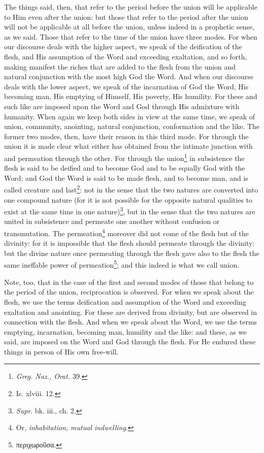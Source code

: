 The things said, then, that refer to the period before the union will be applicable to Him even after the union: but those that refer to the period after the union will not be applicable at all before the union, unless indeed in a prophetic sense, as we said. Those that refer to the time of the union have three modes. For when our discourse deals with the higher aspect, we speak of the deification of the flesh, and His assumption of the Word and exceeding exaltation, and so forth, making manifest the riches that are added to the flesh from the union and natural conjunction with the most high God the Word. And when our discourse deals with the lower aspect, we speak of the incarnation of God the Word, His becoming man, His emptying of Himself, His poverty, His humility. For these and such like are imposed upon the Word and God through His admixture with humanity. When again we keep both sides in view at the same time, we speak of union, community, anointing, natural conjunction, conformation and the like. The former two modes, then, have their reason in this third mode. For through the union it is made clear what either has obtained from the intimate junction with and permeation through the other. For through the union\footnote{\emph{Greg. Naz., Orat. }39.} in subsistence the flesh is said to be deified and to become God and to be equally God with the Word; and God the Word is said to be made flesh, and to become man, and is called creature and last\footnote{Is. xlviii. 12.}: not in the sense that the two natures are converted into one compound nature (for it is not possible for the opposite natural qualities to exist at the same time in one nature)\footnote{\emph{Supr}. bk. iii., ch. 2.}, but in the sense that the two natures are united in subsistence and permeate one another without confusion or transmutation. The permeation\footnote{Or, \emph{inhabitation, mutual indwelling}.} moreover did not come of the flesh but of the divinity: for it is impossible that the flesh should permeate through the divinity: but the divine nature once permeating through the flesh gave also to the flesh the same ineffable power of permeation\footnote{\textgreek{περιχωροῦσα.}}; and this indeed is what we call union.

Note, too, that in the case of the first and second modes of those that belong to the period of the union, reciprocation is observed. For when we speak about the flesh, we use the terms deification and assumption of the Word and exceeding exaltation and anointing. For these are derived from divinity, but are observed in connection with the flesh. And when we speak about the Word, we use the terms emptying, incarnation, becoming man, humility and the like: and these, as we said, are imposed on the Word and God through the flesh. For He endured these things in person of His own free-will.

